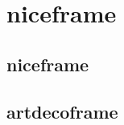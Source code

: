 \documentclass[12pt]{scrartcl}
\begin{document}
\section{niceframe}
	\subsection{niceframe}

\niceframe{\blindtext}


\subsection{artdecoframe}

\artdecoframe{\blindtext}


\subsection{\curlyframe}

\curlyframe{\blindtext}


~~
\end{document}
